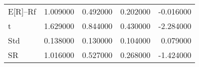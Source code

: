 \begin{tabular}{lrrrr}
\toprule
\midrule
E[R]--Rf & 1.009000 & 0.492000 & 0.202000 & -0.016000 \\
t & 1.629000 & 0.844000 & 0.430000 & -2.284000 \\
Std & 0.138000 & 0.130000 & 0.104000 & 0.079000 \\
SR & 1.016000 & 0.527000 & 0.268000 & -1.424000 \\
\bottomrule
\end{tabular}
